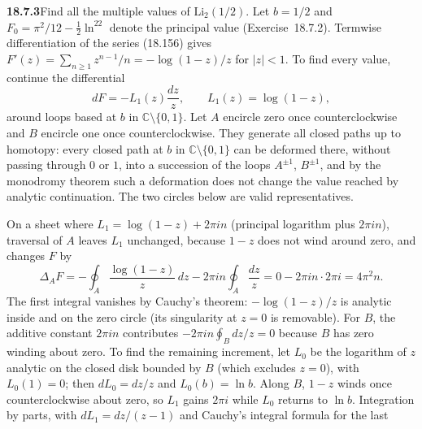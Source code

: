 \par\bigskip
\noindent\textbf{18.7.3}\quad Find all the multiple values of
$\mathrm{Li}_{2}(1/2)$.
\solution
Let $b=1/2$ and $F_0=\pi^2/12-\tfrac12\ln^22$ denote the
principal value (Exercise~18.7.2).  Termwise differentiation of
the series (18.156) gives
$F'(z)=\sum_{n\ge1}z^{n-1}/n=-\log(1-z)/z$ for $|z|<1$.  To find
every value, continue the differential
\[
dF=-L_1(z)\frac{dz}{z},\qquad L_1(z)=\log(1-z),
\]
around loops based at $b$ in $\mathbb C\setminus\{0,1\}$.
Let $A$ encircle zero once counterclockwise and $B$ encircle one
once counterclockwise.  They generate all closed paths up to
homotopy: every closed path at $b$ in $\mathbb C\setminus\{0,1\}$
can be deformed there, without passing through $0$ or $1$, into a
succession of the loops $A^{\pm1}$, $B^{\pm1}$, and by the
monodromy theorem such a deformation does not change the value
reached by analytic continuation.  The two circles below are valid
representatives.
\begin{center}
\end{center}
On a sheet where $L_1=\log(1-z)+2\pi in$ (principal logarithm
plus $2\pi in$), traversal of $A$ leaves $L_1$ unchanged, because
$1-z$ does not wind around zero, and changes $F$ by
\[
\Delta_A F=-\oint_A\frac{\log(1-z)}z\,dz
 -2\pi i n\oint_A\frac{dz}{z}=0-2\pi in\cdot2\pi i=4\pi^2n.
\]
The first integral vanishes by Cauchy's theorem: $-\log(1-z)/z$
is analytic inside and on the zero circle (its singularity at
$z=0$ is removable).
For $B$, the additive constant $2\pi i n$ contributes
$-2\pi in\oint_Bdz/z=0$ because $B$ has zero winding about zero.
To find the remaining increment, let $L_0$ be the logarithm of $z$
analytic on the closed disk bounded by $B$ (which excludes $z=0$),
with $L_0(1)=0$; then $dL_0=dz/z$ and $L_0(b)=\ln b$.  Along $B$,
$1-z$ winds once counterclockwise about zero, so $L_1$ gains
$2\pi i$ while $L_0$ returns to $\ln b$.  Integration by parts,
with $dL_1=dz/(z-1)$ and Cauchy's integral formula for the last
